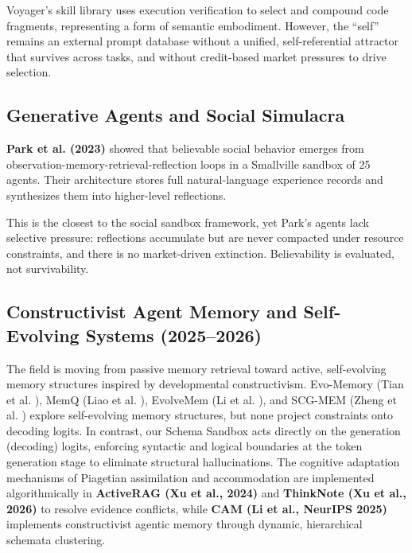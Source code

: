 \documentclass[10pt,journal,compsoc]{IEEEtran}
\begin{document}
Voyager's skill library uses execution verification to select and compound code fragments, representing a form of semantic embodiment. However, the ``self'' remains an external prompt database without a unified, self-referential attractor that survives across tasks, and without credit-based market pressures to drive selection.

\subsection{Generative Agents and Social Simulacra}
\textbf{Park et al. (2023)} \cite{park2023} showed that believable social behavior emerges from observation-memory-retrieval-reflection loops in a Smallville sandbox of 25 agents. Their architecture stores full natural-language experience records and synthesizes them into higher-level reflections.

This is the closest to the social sandbox framework, yet Park's agents lack selective pressure: reflections accumulate but are never compacted under resource constraints, and there is no market-driven extinction. Believability is evaluated, not survivability.

\subsection{Constructivist Agent Memory and Self-Evolving Systems (2025--2026)}
The field is moving from passive memory retrieval toward active, self-evolving memory structures inspired by developmental constructivism. Evo-Memory (Tian et al. \cite{evomemory2025v1}), MemQ (Liao et al. \cite{memq2026v1}), EvolveMem (Li et al. \cite{evolvemem2026v1}), and SCG-MEM (Zheng et al. \cite{zheng2026scgmemv1}) explore self-evolving memory structures, but none project constraints onto decoding logits. In contrast, our Schema Sandbox acts directly on the generation (decoding) logits, enforcing syntactic and logical boundaries at the token generation stage to eliminate structural hallucinations. The cognitive adaptation mechanisms of Piagetian assimilation and accommodation are implemented algorithmically in \textbf{ActiveRAG (Xu et al., 2024)} \cite{xu2024activeragv1} and \textbf{ThinkNote (Xu et al., 2026)} \cite{xu2026thinknote} to resolve evidence conflicts, while \textbf{CAM (Li et al., NeurIPS 2025)} \cite{li2025cam} implements constructivist agentic memory through dynamic, hierarchical schemata clustering.
\end{document}
